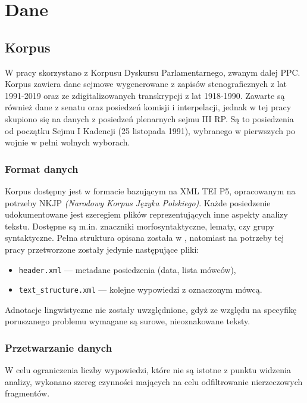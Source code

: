 
\chapter{Dane}

\section{Korpus}\label{sec:korpus}
  W pracy skorzystano z Korpusu Dyskursu Parlamentarnego\cite{PPC}, zwanym dalej PPC.
  Korpus zawiera dane sejmowe wygenerowane z zapisów stenograficznych z lat 1991-2019
    oraz ze zdigitalizowanych transkrypcji z lat 1918-1990.
  Zawarte są również dane z senatu oraz posiedzeń komisji i interpelacji,
    jednak w tej pracy skupiono się na danych z posiedzeń plenarnych sejmu III RP.
  Są to posiedzenia od początku Sejmu I Kadencji (25 listopada 1991), wybranego w pierwszych po wojnie w pełni wolnych wyborach.
  
  \subsection{Format danych}
    Korpus dostępny jest w formacie bazującym na XML TEI P5, opracowanym na potrzeby NKJP \textit{(Narodowy Korpus Języka Polskiego)}.
    Każde posiedzenie udokumentowane jest szeregiem plików reprezentujących inne aspekty analizy tekstu.
    Dostępne są m.in. znaczniki morfosyntaktyczne, lematy, czy grupy syntaktyczne.
    Pełna struktura opisana została w \cite[Ogrodniczuk, 2012]{PSC},
      natomiast na potrzeby tej pracy przetworzone zostały jedynie następujące pliki:
    \begin{itemize}
      \item \verb|header.xml| --- metadane posiedzenia (data, lista mówców),
      \item \verb|text_structure.xml| --- kolejne wypowiedzi z oznaczonym mówcą.
    \end{itemize}
    Adnotacje lingwistyczne nie zostały uwzględnione,
      gdyż ze względu na specyfikę poruszanego problemu wymagane są surowe, nieoznakowane teksty.
    
  \subsection{Przetwarzanie danych}
    W celu ograniczenia liczby wypowiedzi, które nie są istotne z punktu widzenia analizy,
      wykonano szereg czynności mających na celu odfiltrowanie nierzeczowych fragmentów.
    
